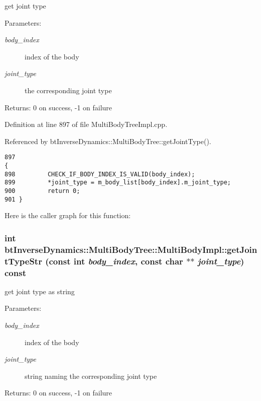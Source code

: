get joint type \begin{Desc}
\item[Parameters:]
\begin{description}
\item[{\em body\_\-index}]index of the body \item[{\em joint\_\-type}]the corresponding joint type \end{description}
\end{Desc}
\begin{Desc}
\item[Returns:]0 on success, -1 on failure \end{Desc}
 

Definition at line 897 of file MultiBodyTreeImpl.cpp.

Referenced by btInverseDynamics::MultiBodyTree::getJointType().

\begin{Code}\begin{verbatim}897                                                                                               {
898         CHECK_IF_BODY_INDEX_IS_VALID(body_index);
899         *joint_type = m_body_list[body_index].m_joint_type;
900         return 0;
901 }
\end{verbatim}
\end{Code}




Here is the caller graph for this function:\hypertarget{classbt_inverse_dynamics_1_1_multi_body_tree_1_1_multi_body_impl_42b50ff5d4a4dad7687d8716e737cf04}{
\subsubsection[getJointTypeStr]{\setlength{\rightskip}{0pt plus 5cm}int btInverseDynamics::MultiBodyTree::MultiBodyImpl::getJointTypeStr (const int {\em body\_\-index}, \/  const char $\ast$$\ast$ {\em joint\_\-type}) const}}
\label{classbt_inverse_dynamics_1_1_multi_body_tree_1_1_multi_body_impl_42b50ff5d4a4dad7687d8716e737cf04}


get joint type as string \begin{Desc}
\item[Parameters:]
\begin{description}
\item[{\em body\_\-index}]index of the body \item[{\em joint\_\-type}]string naming the corresponding joint type \end{description}
\end{Desc}
\begin{Desc}
\item[Returns:]0 on success, -1 on failure \end{Desc}
 

